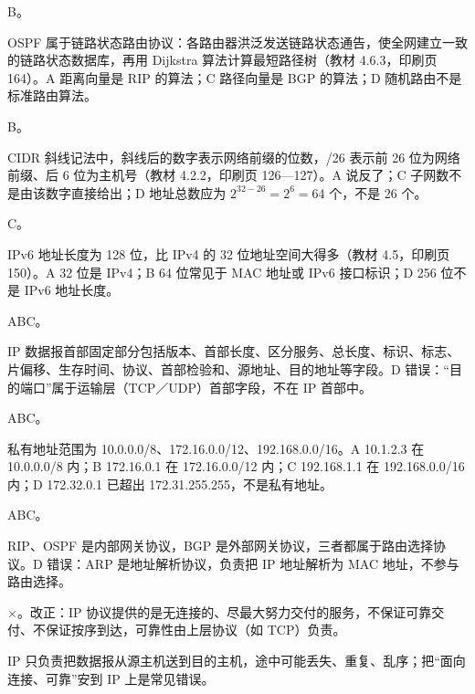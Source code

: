 \documentclass[a4paper,11pt]{article}
\begin{document}
\q B。\begin{analysis}OSPF 属于链路状态路由协议：各路由器洪泛发送链路状态通告，使全网建立一致的链路状态数据库，再用 Dijkstra 算法计算最短路径树（教材 4.6.3，印刷页 164）。A 距离向量是 RIP 的算法；C 路径向量是 BGP 的算法；D 随机路由不是标准路由算法。\end{analysis}

\q B。\begin{analysis}CIDR 斜线记法中，斜线后的数字表示网络前缀的位数，/26 表示前 26 位为网络前缀、后 6 位为主机号（教材 4.2.2，印刷页 126—127）。A 说反了；C 子网数不是由该数字直接给出；D 地址总数应为 $2^{32-26}=2^{6}=64$ 个，不是 26 个。\end{analysis}

\q C。\begin{analysis}IPv6 地址长度为 128 位，比 IPv4 的 32 位地址空间大得多（教材 4.5，印刷页 150）。A 32 位是 IPv4；B 64 位常见于 MAC 地址或 IPv6 接口标识；D 256 位不是 IPv6 地址长度。\end{analysis}


\q ABC。\begin{analysis}IP 数据报首部固定部分包括版本、首部长度、区分服务、总长度、标识、标志、片偏移、生存时间、协议、首部检验和、源地址、目的地址等字段。D 错误：“目的端口”属于运输层（TCP／UDP）首部字段，不在 IP 首部中。\end{analysis}

\q ABC。\begin{analysis}私有地址范围为 10.0.0.0/8、172.16.0.0/12、192.168.0.0/16。A 10.1.2.3 在 10.0.0.0/8 内；B 172.16.0.1 在 172.16.0.0/12 内；C 192.168.1.1 在 192.168.0.0/16 内；D 172.32.0.1 已超出 172.31.255.255，不是私有地址。\end{analysis}

\q ABC。\begin{analysis}RIP、OSPF 是内部网关协议，BGP 是外部网关协议，三者都属于路由选择协议。D 错误：ARP 是地址解析协议，负责把 IP 地址解析为 MAC 地址，不参与路由选择。\end{analysis}


\q ×。改正：IP 协议提供的是无连接的、尽最大努力交付的服务，不保证可靠交付、不保证按序到达，可靠性由上层协议（如 TCP）负责。\begin{analysis}IP 只负责把数据报从源主机送到目的主机，途中可能丢失、重复、乱序；把“面向连接、可靠”安到 IP 上是常见错误。\end{analysis}
\end{document}
